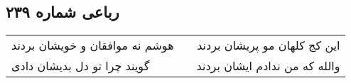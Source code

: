 \begin{center}
\section*{رباعی شماره ۲۳۹}
\label{sec:sh239}
\begin{longtable}{l p{0.5cm} r}
هوشم نه موافقان و خویشان بردند
&&
این کج کلهان مو پریشان بردند
\\
گویند چرا تو دل بدیشان دادی
&&
والله که من ندادم ایشان بردند
\\
\end{longtable}
\end{center}
